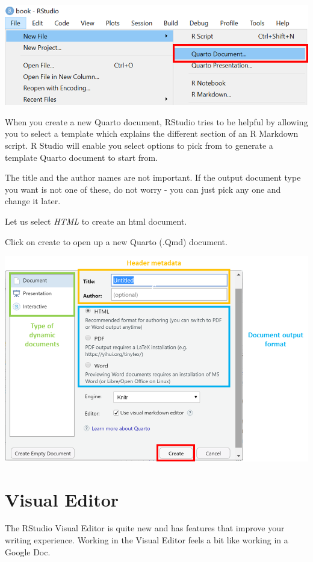 \documentclass[
  letterpaper,
  DIV=11,
  numbers=noendperiod]{scrreprt}
\begin{document}
\includegraphics{./images/paste-A7DE8B60.png}

When you create a new Quarto document, RStudio tries to be helpful by
allowing you to select a template which explains the different section
of an R Markdown script. R Studio will enable you select options to pick
from to generate a template Quarto document to start from.

The title and the author names are not important. If the output document
type you want is not one of these, do not worry - you can just pick any
one and change it later.

Let us select \emph{HTML} to create an html document.

Click on create to open up a new Quarto (.Qmd) document.

\includegraphics{./images/paste-67B97E04.png}

\hypertarget{visual-editor}{%
\section{Visual Editor}\label{visual-editor}}

The RStudio Visual Editor is quite new and has features that improve
your writing experience. Working in the Visual Editor feels a bit like
working in a Google Doc.
\end{document}
